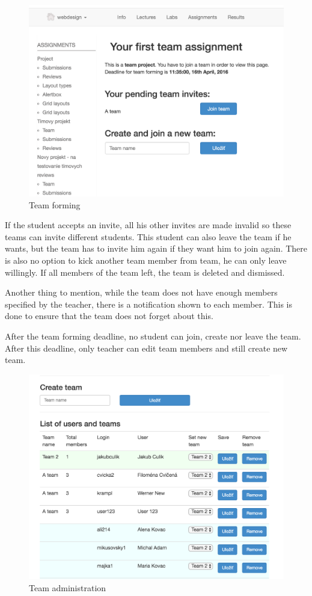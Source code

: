 \begin{figure}[h]
    \centering
    \includegraphics[width=\textwidth]{images/teamforming.png}
    \caption{Team forming}
    \label{team_forming}
\end{figure}

If the student accepts an invite, all his other invites are made invalid so these teams can invite different students. This student can also leave the team if he wants, but the team has to invite him again if they want him to join again. There is also no option to kick another team member from team, he can only leave willingly. If all members of the team left, the team is deleted and dismissed.

Another thing to mention, while the team does not have enough members specified by the teacher, there is a notification shown to each member. This is done to ensure that the team does not forget about this.

After the team forming deadline, no student can join, create nor leave the team. After this deadline, only teacher can edit team members and still create new team. 

\begin{figure}[h]
    \centering
    \includegraphics[width=\textwidth]{images/teamadmin.png}
    \caption{Team administration}
    \label{team_forming}
\end{figure}

